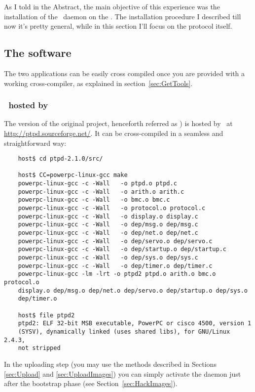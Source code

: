 As I told in the Abstract, the main objective of this experience was the
installation of the \PTP\ daemon on the \MyBoard. The installation
procedure I described till now it's pretty general, while in this section
I'll focus on the protocol itself.

\subsection{ The software }

    The two applications can be easily cross compiled once you are
    provided with a working cross-compiler, as explained in
    section~\ref{sec:GetTools}.

    \subsubsection{ \PTPd\ hosted by \SourceForge }

        The  version of the original project, henceforth
        referred as \PTPd) is hosted by \SourceForge\ at
        \url{http://ptpd.sourceforge.net/}. It can be cross-compiled
        in a seamless and straightforward way:
\begin{lstlisting}
    host$ cd ptpd-2.1.0/src/

    host$ CC=powerpc-linux-gcc make
    powerpc-linux-gcc -c -Wall   -o ptpd.o ptpd.c
    powerpc-linux-gcc -c -Wall   -o arith.o arith.c
    powerpc-linux-gcc -c -Wall   -o bmc.o bmc.c
    powerpc-linux-gcc -c -Wall   -o protocol.o protocol.c
    powerpc-linux-gcc -c -Wall   -o display.o display.c
    powerpc-linux-gcc -c -Wall   -o dep/msg.o dep/msg.c
    powerpc-linux-gcc -c -Wall   -o dep/net.o dep/net.c
    powerpc-linux-gcc -c -Wall   -o dep/servo.o dep/servo.c
    powerpc-linux-gcc -c -Wall   -o dep/startup.o dep/startup.c
    powerpc-linux-gcc -c -Wall   -o dep/sys.o dep/sys.c
    powerpc-linux-gcc -c -Wall   -o dep/timer.o dep/timer.c
    powerpc-linux-gcc -lm -lrt -o ptpd2 ptpd.o arith.o bmc.o protocol.o
    display.o dep/msg.o dep/net.o dep/servo.o dep/startup.o dep/sys.o
    dep/timer.o

    host$ file ptpd2
    ptpd2: ELF 32-bit MSB executable, PowerPC or cisco 4500, version 1
    (SYSV), dynamically linked (uses shared libs), for GNU/Linux 2.4.3,
    not stripped
\end{lstlisting}

        In the uploading step (you may use the methods described in
        Sections \ref{sec:Upload} and \ref{sec:UploadImages}) you can
        simply activate the daemon just after the bootstrap phase (see
        Section~\ref{sec:HackImages}).

